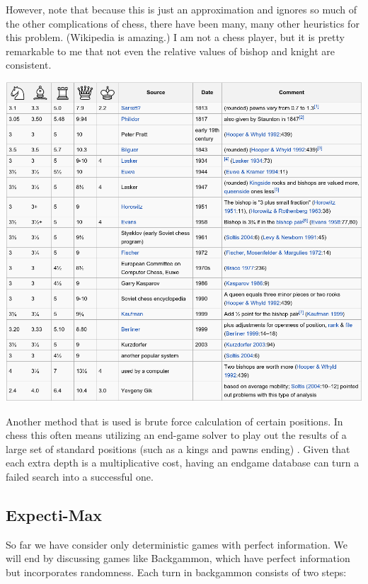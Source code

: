 \documentclass[11pt]{article}
\begin{document}
However, note that because this is just an approximation and ignores so much of the other complications of chess, there have been many, many other heuristics for this problem. (Wikipedia is amazing.) I am not a chess player, but it is pretty remarkable to me that not even the relative values of bishop and knight are consistent.

\centerline{ \includegraphics[width=16cm]{pics/chess_value}}
\vspace{1cm}

Another method that is used is brute force calculation of certain positions. In chess this often means utilizing an end-game solver to play out the results of a large set of standard positions (such as a kings and pawns ending) . Given that each extra depth is a multiplicative cost, having an endgame database can turn a failed search into a successful one.





\subsection{Expecti-Max}

So far we have consider only deterministic games with perfect information. We will end by discussing games like Backgammon, which have perfect information but incorporates randomness. Each turn in backgammon consists of two steps:
\end{document}
